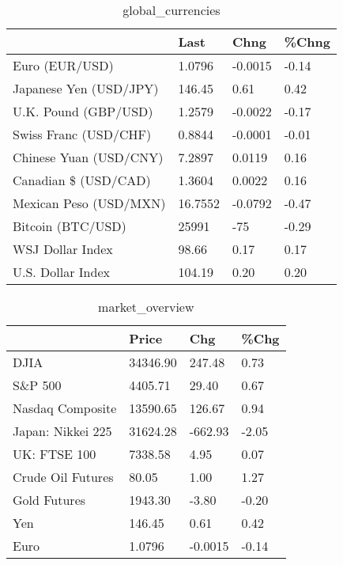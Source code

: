 \documentclass{article}%
\begin{document}
%


\begin{table}[htbp]%
\caption{global\_currencies}%
\centering%
\begin{adjustbox}{width=1\textwidth}%
\begin{tabular}{llll}
\toprule
                       &    Last &    Chng & \%Chng \\
\midrule
        Euro (EUR/USD) &  1.0796 & -0.0015 & -0.14 \\
Japanese Yen (USD/JPY) &  146.45 &    0.61 &  0.42 \\
  U.K. Pound (GBP/USD) &  1.2579 & -0.0022 & -0.17 \\
 Swiss Franc (USD/CHF) &  0.8844 & -0.0001 & -0.01 \\
Chinese Yuan (USD/CNY) &  7.2897 &  0.0119 &  0.16 \\
  Canadian \$ (USD/CAD) &  1.3604 &  0.0022 &  0.16 \\
Mexican Peso (USD/MXN) & 16.7552 & -0.0792 & -0.47 \\
     Bitcoin (BTC/USD) &   25991 &     -75 & -0.29 \\
      WSJ Dollar Index &   98.66 &    0.17 &  0.17 \\
     U.S. Dollar Index &  104.19 &    0.20 &  0.20 \\
\bottomrule
\end{tabular}
%
\end{adjustbox}%
\end{table}

%


\begin{table}[htbp]%
\caption{market\_overview}%
\centering%
\begin{adjustbox}{width=1\textwidth}%
\begin{tabular}{llll}
\toprule
                  &    Price &     Chg &  \%Chg \\
\midrule
             DJIA & 34346.90 &  247.48 &  0.73 \\
          S\&P 500 &  4405.71 &   29.40 &  0.67 \\
 Nasdaq Composite & 13590.65 &  126.67 &  0.94 \\
Japan: Nikkei 225 & 31624.28 & -662.93 & -2.05 \\
     UK: FTSE 100 &  7338.58 &    4.95 &  0.07 \\
Crude Oil Futures &    80.05 &    1.00 &  1.27 \\
     Gold Futures &  1943.30 &   -3.80 & -0.20 \\
              Yen &   146.45 &    0.61 &  0.42 \\
             Euro &   1.0796 & -0.0015 & -0.14 \\
\bottomrule
\end{tabular}
%
\end{adjustbox}%
\end{table}

%
\end{document}
